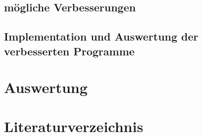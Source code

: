 \documentclass[ngerman,BCOR=4mm]{tudscrreprt}
\theoremstyle{plain} %
\theoremstyle{definition} %
\theoremstyle{remark}
\begin{document}
      \section{mögliche Verbesserungen}

      \section{Implementation und Auswertung der verbesserten Programme}

\chapter{Auswertung}
\label{sec: Auswertung}

\chapter{Literaturverzeichnis}
      \printbibliography
\end{document}
